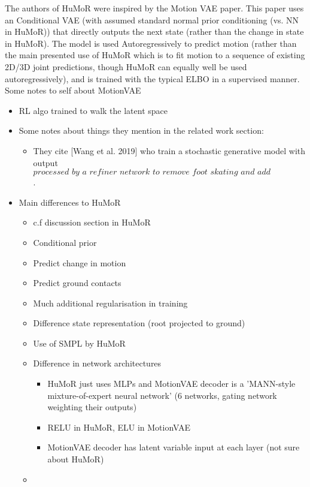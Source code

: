 The authors of HuMoR \cite{humor} were inspired by the Motion VAE \cite{MotionVAE} paper. This paper uses an Conditional VAE (with assumed standard normal prior conditioning (vs. NN in HuMoR)) that directly outputs the next state (rather than the change in state in HuMoR). The model is used Autoregressively to predict motion (rather than the main presented use of HuMoR which is to fit motion to a sequence of existing 2D/3D joint predictions, though HuMoR can equally well be used autoregressively), and is trained with the typical ELBO in a supervised manner. \\
Some notes to self about MotionVAE
\begin{itemize}
    \item RL algo trained to walk the latent space
    \item Some notes about things they mention in the related work section:
    \begin{itemize}
        \item They cite [Wang et al. 2019] who train a stochastic generative model with output $\textit{processed by a refiner network to remove foot skating and add robustness}$.
    \end{itemize}
    \item Main differences to HuMoR
    \begin{itemize}
        \item c.f discussion section in HuMoR
        \item Conditional prior
        \item Predict change in motion
        \item Predict ground contacts
        \item Much additional regularisation in training
        \item Difference state representation (root projected to ground)
        \item Use of SMPL by HuMoR
        \item Difference in network architectures
        \begin{itemize}
            \item HuMoR just uses MLPs and MotionVAE decoder is a 'MANN-style mixture-of-expert neural network' (6 networks, gating network weighting their outputs)
            \item RELU in HuMoR, ELU in MotionVAE
            \item MotionVAE decoder has latent variable input at each layer (not sure about HuMoR)
        \end{itemize}
        \item 
    \end{itemize}
\end{itemize}


